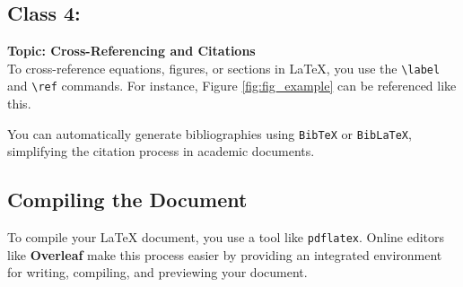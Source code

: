\subsection{Class 4:}
\textbf{Topic: Cross-Referencing and Citations} \\

To cross-reference equations, figures, or sections in \LaTeX{}, you use the \verb|\label| and \verb|\ref| commands. For instance, Figure \ref{fig:fig_example} can be referenced like this.

You can automatically generate bibliographies using \texttt{BibTeX} or \texttt{BibLaTeX}, simplifying the citation process in academic documents.

\subsection{Compiling the Document}
To compile your \LaTeX{} document, you use a tool like \texttt{pdflatex}. Online editors like \textbf{Overleaf} make this process easier by providing an integrated environment for writing, compiling, and previewing your document.
